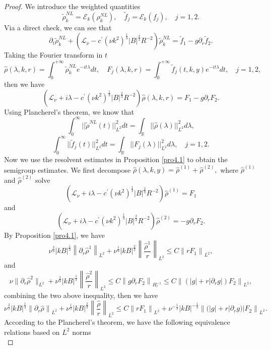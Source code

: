 \documentclass[final, 12pt,reqno]{amsart}
\numberwithin{equation}{section}
\begin{document}
 \begin{proof}
    We introduce the weighted quantities
    $$\tilde{\rho}_{k}^{NL}=\mathcal{E}_k(\rho_k^{NL}), \quad\tilde{f}_j=\mathcal{E}_k(f_j),\quad j=1,2.$$
    Via a direct check, we can see that
    $$\partial_t\tilde{\rho}_k^{NL}+\left( \mathcal{L}_\nu-c^{\prime}\left(\nu k^2\right)^{\frac{1}{3}}|B|^{\frac{2}{3}} R^{-2}\right)  \tilde{\rho}_k^{NL}=\tilde{f}_1-g\partial_r\tilde{f}_2.$$
 Taking the Fourier transform in $t$
    $$\hat{\rho}(\lambda,k,r)=\int_{0}^{+\infty}\tilde{\rho}_k^{NL}e^{-it\lambda}dt,\quad F_j(\lambda,k,r)=\int_{0}^{+\infty}\tilde{f}_j(t,k,y)e^{-it\lambda}dt,\quad j=1,2,$$
    then we have
    $$\left( \mathcal{L}_\nu+i\lambda-c^{\prime}\left(\nu k^2\right)^{\frac{1}{3}}|B|^{\frac{2}{3}} R^{-2}\right)  \hat{\rho}(\lambda,k,r)=F_1-g\partial_rF_2.$$
    Using Plancherel's theorem, we know that
    $$\int_{0}^{\infty}||\tilde{\rho}^{NL}(t)||^2_{L^2}dt=\int_{\mathbb{R}}||\hat{\rho}(\lambda)||^2_{L^2}d\lambda,$$
    $$\int_{0}^{\infty}||\tilde{f}_j(t)||^2_{L^2}dt=\int_{\mathbb{R}}||F_j(\lambda)||^2_{L^2}d\lambda,\quad j=1,2.$$
    Now we use the resolvent estimates in Proposition \ref{pro4.1}  to obtain the semigroup estimates. We first decompose $\hat{\rho}(\lambda,k,y)=\hat{\rho}^{(1)}+\hat{\rho}^{(2)},$
    where $\hat{\rho}^{(1)}$ and $\hat{\rho}^{(2)}$ solve
    $$\left( \mathcal{L}_\nu+i\lambda-c^{\prime}\left(\nu k^2\right)^{\frac{1}{3}}|B|^{\frac{2}{3}} R^{-2}\right)  \hat{\rho}^{(1)}=F_1$$
    and
    $$\left( \mathcal{L}_\nu+i\lambda-c^{\prime}\left(\nu k^2\right)^{\frac{1}{3}}|B|^{\frac{2}{3}} R^{-2}\right)  \hat{\rho}^{(2)}=-g\partial_rF_2.$$
    By Proposition \ref{pro4.1},
    we have $$\nu^{\frac{2}{3}}|k B|^{\frac{1}{3}}\left\|\partial_r\hat{\rho}^1\right\|_{L^2}+\nu^{\frac{1}{3}}|k B|^{\frac{2}{3}}\left\|\frac{\hat{\rho}^1}{r}\right\|_{L^2} \leq C\left\|r F_1\right\|_{L^2},$$
    and
    $$  \nu\|\partial_r\hat{\rho}^2\|_{L^2}+\nu^{\frac{2}{3}}|k B|^{\frac{1}{3}}\left\|\frac{\hat{\rho}^2}{r}\right\|_{L^2} \leq C\left\|g\partial_rF_2\right\|_{H_r^{-1}}\leq C\left\|(|g|+r|\partial_{r}g|)F_2\right\|_{L^{2}},$$
    combining the two above inequality, then we have
    $$\nu^{\frac{2}{3}}|k B|^{\frac{1}{3}}\left\|\partial_r\hat{\rho}\right\|_{L^2}+\nu^{\frac{1}{3}}|k B|^{\frac{2}{3}}\left\|\frac{\hat{\rho}}{r}\right\|_{L^2} \leq C\left\|r F_1\right\|_{L^2}+\nu^{-\frac{1}{3}}|k B|^{-\frac{1}{3}}\left\|(|g|+r|\partial_{r}g)|F_2\right\|_{L^{2}}.$$
    According to the Plancherel's theorem, we have the following equivalence relations
    based on $L^2$ norms
  \begin{equation}\label{5.9}

\end{equation}
\end{proof}
\end{document}

